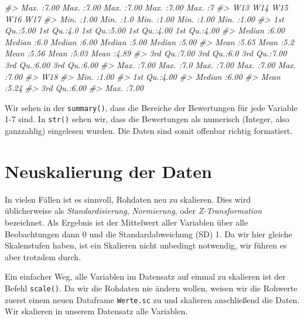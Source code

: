 \documentclass[12pt,ngerman,]{book}
\makeatletter
\newenvironment{Shaded}{\begin{snugshade}}{\end{snugshade}}
\newcommand{\CommentTok}[1]{\textcolor[rgb]{0.56,0.35,0.01}{\textit{{#1}}}}
\newenvironment{kframe}{%
\medskip{}
\setlength{\fboxsep}{.8em}
 \def\at@end@of@kframe{}%
 \ifinner\ifhmode%
  \def\at@end@of@kframe{\end{minipage}}%
  \begin{minipage}{\columnwidth}%
 \fi\fi%
 \def\FrameCommand##1{\hskip\@totalleftmargin \hskip-\fboxsep
 \colorbox{shadecolor}{##1}\hskip-\fboxsep
     \hskip-\linewidth \hskip-\@totalleftmargin \hskip\columnwidth}%
 \MakeFramed {\advance\hsize-\width
   \@totalleftmargin\z@ \linewidth\hsize
   \@setminipage}}%
 {\par\unskip\endMakeFramed%
 \at@end@of@kframe}
\renewenvironment{Shaded}{\begin{kframe}}{\end{kframe}}
\makeatother
\begin{document}
\begin{Shaded}
\begin{Highlighting}[]
\CommentTok{#>  Max.   :7.00   Max.   :7.00   Max.   :7.00   Max.   :7.00   Max.   :7  }
\CommentTok{#>       W13            W14           W15            W16            W17      }
\CommentTok{#>  Min.   :1.00   Min.   :1.0   Min.   :1.00   Min.   :1.00   Min.   :1.00  }
\CommentTok{#>  1st Qu.:5.00   1st Qu.:4.0   1st Qu.:5.00   1st Qu.:4.00   1st Qu.:4.00  }
\CommentTok{#>  Median :6.00   Median :6.0   Median :6.00   Median :5.00   Median :5.00  }
\CommentTok{#>  Mean   :5.65   Mean   :5.2   Mean   :5.56   Mean   :5.03   Mean   :4.89  }
\CommentTok{#>  3rd Qu.:7.00   3rd Qu.:6.0   3rd Qu.:7.00   3rd Qu.:6.00   3rd Qu.:6.00  }
\CommentTok{#>  Max.   :7.00   Max.   :7.0   Max.   :7.00   Max.   :7.00   Max.   :7.00  }
\CommentTok{#>       W18      }
\CommentTok{#>  Min.   :1.00  }
\CommentTok{#>  1st Qu.:4.00  }
\CommentTok{#>  Median :6.00  }
\CommentTok{#>  Mean   :5.24  }
\CommentTok{#>  3rd Qu.:6.00  }
\CommentTok{#>  Max.   :7.00}
\end{Highlighting}
\end{Shaded}

Wir sehen in der \texttt{summary()}, dass die Bereiche der Bewertungen
für jede Variable 1-7 sind. In \texttt{str()} sehen wir, dass die
Bewertungen als numerisch (Integer, also ganzzahlig) eingelesen wurden.
Die Daten sind somit offenbar richtig formatiert.

\section{Neuskalierung der Daten}\label{neuskalierung-der-daten}

In vielen Fällen ist es sinnvoll, Rohdaten neu zu skalieren. Dies wird
üblicherweise als \emph{Standardisierung}, \emph{Normierung}, oder
\emph{Z-Transformation} bezeichnet. Als Ergebnis ist der Mittelwert
aller Variablen über alle Beobachtungen dann 0 und die
Standardabweichung (SD) 1. Da wir hier gleiche Skalenstufen haben, ist
ein Skalieren nicht unbedingt notwendig, wir führen es aber trotzdem
durch.

Ein einfacher Weg, alle Variablen im Datensatz auf einmal zu skalieren
ist der Befehl \texttt{scale()}. Da wir die Rohdaten nie ändern wollen,
weisen wir die Rohwerte zuerst einem neuen Dataframe \texttt{Werte.sc}
zu und skalieren anschließend die Daten. Wir skalieren in unserem
Datensatz alle Variablen.
\end{document}
